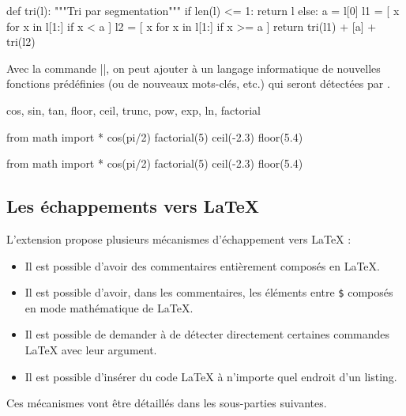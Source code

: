 \documentclass[dvipsnames,svgnames]{article}
\begin{document}
\bigskip

\begingroup


\begin{Piton}
def tri(l):
    """Tri par segmentation"""
    if len(l) <= 1:
        return l
    else:
        a = l[0]
        l1 = [ x for x in l[1:] if x < a  ]
        l2 = [ x for x in l[1:] if x >= a ]
        return tri(l1) + [a] + tri(l2)
\end{Piton}

\endgroup

\bigskip
Avec la commande |\SetPitonIdentifier|, on peut ajouter à un langage informatique de
nouvelles fonctions prédéfinies (ou de nouveaux mots-clés, etc.) qui seront détectées par
.

\medskip
\begin{Code}
\emph{\SetPitonIdentifier[Python]}
  {cos, sin, tan, floor, ceil, trunc, pow, exp, ln, factorial}
  {}

\begin{Piton}
from math import *
cos(pi/2) 
factorial(5)
ceil(-2.3) 
floor(5.4) 
\end{Piton}
\end{Code}



\medskip
\begingroup

  {}
 
\begin{Piton}
from math import *
cos(pi/2) 
factorial(5)
ceil(-2.3) 
floor(5.4) 
\end{Piton}


\endgroup



\subsection{Les échappements vers LaTeX}

\label{LaTeX-escapes}

L'extension  propose plusieurs mécanismes d'échappement vers LaTeX :
\begin{itemize}
\item Il est possible d'avoir des commentaires entièrement composés en LaTeX.
\item Il est possible d'avoir, dans les commentaires, les éléments entre
\texttt{\$} composés en mode mathématique de LaTeX.
\item Il est possible de demander à  de détecter directement certaines
commandes LaTeX avec leur argument.
\item Il est possible d'insérer du code LaTeX à n'importe quel endroit d'un listing.
\end{itemize}
Ces mécanismes vont être détaillés dans les sous-parties suivantes.
\end{document}
